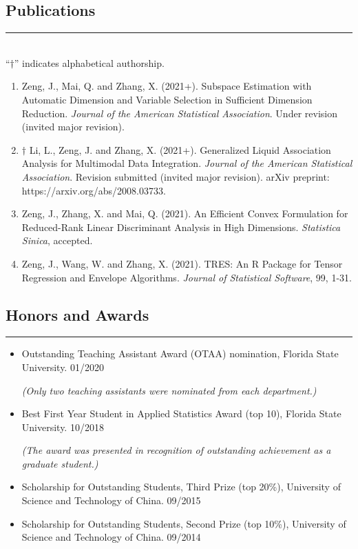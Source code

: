 \documentclass[10pt, oneside]{article}
\begin{document}
\subsection*{Publications}
\noindent\rule{\textwidth}{1pt}\\[1mm]
``$\dagger$'' indicates alphabetical authorship.
\begin{enumerate}[itemsep=0pt]
    \item Zeng, J., Mai, Q. and Zhang, X. (2021+). Subspace Estimation with Automatic Dimension and Variable Selection in Sufficient Dimension Reduction. \textit{Journal of the American Statistical Association}. Under revision (invited major revision).
    \item $\dagger$ Li, L., Zeng, J. and Zhang, X. (2021+). Generalized Liquid Association Analysis for Multimodal Data Integration. \textit{Journal of the American Statistical Association}. Revision submitted (invited major revision). arXiv preprint: https://arxiv.org/abs/2008.03733.
    \item Zeng, J., Zhang, X. and Mai, Q. (2021). An Efficient Convex Formulation for Reduced-Rank Linear Discriminant Analysis in High Dimensions. \textit{Statistica Sinica}, accepted.
    \item Zeng, J., Wang, W. and Zhang, X. (2021). TRES: An R Package for Tensor Regression and Envelope Algorithms. \textit{Journal of Statistical Software}, 99, 1-31.
\end{enumerate}

\subsection*{Honors and Awards}
\noindent\rule{\textwidth}{1pt}
\begin{itemize}[itemsep=-1pt]
    \item Outstanding Teaching Assistant Award (OTAA) nomination, Florida State University. \hfill 01/2020

    \vspace{-0.5mm}
    \textit{(Only two teaching assistants were nominated from each department.)}
    \item Best First Year Student in Applied Statistics Award (top 10), Florida State University. \hfill 10/2018

    \vspace{-0.5mm}
    \textit{(The award was presented in recognition of outstanding achievement as a graduate student.)}
    \item Scholarship for Outstanding Students, Third Prize (top 20\%), University of Science and Technology of China. \hfill 09/2015
    \item Scholarship for Outstanding Students, Second Prize (top 10\%), University of Science and Technology of China. \hfill 09/2014
\end{itemize}
\end{document}
